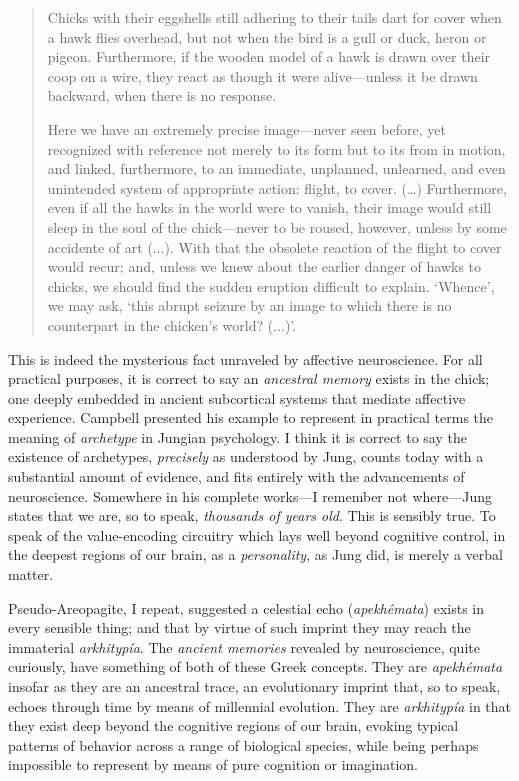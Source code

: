 \documentclass[a4paper]{article}
\begin{document}
\begin{quote}
    Chicks with their eggshells still adhering to their tails dart for
    cover when a hawk flies overhead, but not when the bird is a gull or
    duck, heron or pigeon. Furthermore, if the wooden model of a hawk is
    drawn over their coop on a wire, they react as though it were
    alive---unless it be drawn backward, when there is no response.

    Here we have an extremely precise image---never seen before, yet
    recognized with reference not merely to its form but to its from in
    motion, and linked, furthermore, to an immediate, unplanned, unlearned,
    and even unintended system of appropriate action: flight, to cover.
    (\ldots) Furthermore, even if all the hawks in the world were to
    vanish, their image would still sleep in the soul of the chick---never
    to be roused, however, unless by some accidente of art ($\ldots$). With
    that the obsolete reaction of the flight to cover would recur; and,
    unless we knew about the earlier danger of hawks to chicks, we should
    find the sudden eruption difficult to explain. \lq Whence\rq, we may
    ask, \lq this abrupt seizure by an image to which there is no
    counterpart in the chicken's world? ($\ldots$)\rq.
\end{quote}

This is indeed the mysterious fact unraveled by affective neuroscience. For all
practical purposes, it is correct to say an \textit{ancestral memory} exists in
the chick; one deeply embedded in ancient subcortical systems that mediate
affective experience. Campbell presented his example to represent in practical
terms the meaning of \textit{archetype} in Jungian psychology. I think it is
correct to say the existence of archetypes, \textit{precisely} as understood by
Jung, counts today with a substantial amount of evidence, and fits entirely with
the advancements of neuroscience. Somewhere in his complete works---I remember
not where---Jung states that we are, so to speak, \textit{thousands of years
old}. This is sensibly true. To speak of the value-encoding circuitry which lays
well beyond cognitive control, in the deepest regions of our brain, as a
\textit{personality}, as Jung did, is merely a verbal matter. 

Pseudo-Areopagite, I repeat, suggested a celestial echo (\textit{apekhémata})
exists in every sensible thing; and that by virtue of such imprint they may
reach the immaterial \textit{arkhitypía}. The \textit{ancient memories} revealed
by neuroscience, quite curiously, have something of both of these Greek
concepts. They are \textit{apekhémata} insofar as they are an ancestral trace, an
evolutionary imprint that, so to speak, echoes through
time by means of millennial evolution. They are \textit{arkhitypía} in that they
exist deep beyond the cognitive regions of our brain, evoking typical
patterns of behavior across a range of biological species, while being perhaps
impossible to represent by means of pure cognition or imagination.
\end{document}
